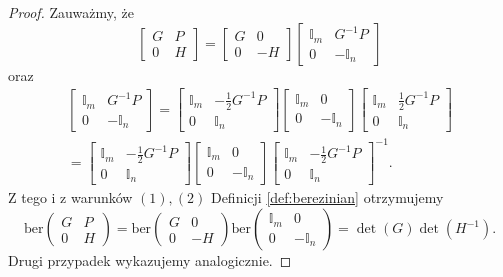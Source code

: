 \documentclass[11pt,a4paper]{report}
\theoremstyle{definition}
\newcommand{\ber}{\mathrm{ber}}
\begin{document}
\begin{proof}
 Zauważmy, że $$\begin{bmatrix}
      G & P \\
      0 & H
     \end{bmatrix} 
     = 
     \begin{bmatrix}
      G & 0 \\
      0 & -H
     \end{bmatrix} \begin{bmatrix}
      \mathbb{I}_m & G^{-1}P \\
      0 & - \mathbb{I}_n
     \end{bmatrix}$$ oraz
     \begin{equation*}
     \begin{aligned}
	  \begin{bmatrix}
	  \mathbb{I}_m & G^{-1}P \\
	  0 & - \mathbb{I}_n
	\end{bmatrix} 
	= 
	\begin{bmatrix}
	  \mathbb{I}_m & -\frac{1}{2}G^{-1}P \\
	  0 & \mathbb{I}_n
	\end{bmatrix} \begin{bmatrix}
	  \mathbb{I}_m & 0 \\
	  0 & - \mathbb{I}_n
	\end{bmatrix} \begin{bmatrix}
	  \mathbb{I}_m & \frac{1}{2}G^{-1}P \\
	  0 & \mathbb{I}_n
	\end{bmatrix} \\
	= 
	\begin{bmatrix}
	  \mathbb{I}_m & -\frac{1}{2}G^{-1}P \\
	  0 & \mathbb{I}_n
	\end{bmatrix} \begin{bmatrix}
	  \mathbb{I}_m & 0 \\
	  0 & - \mathbb{I}_n
	\end{bmatrix} \begin{bmatrix}
	  \mathbb{I}_m & -\frac{1}{2} G^{-1}P \\
	  0 & \mathbb{I}_n
	\end{bmatrix}^{-1}\!.
     \end{aligned}
     \end{equation*}
 Z tego i z warunków $(1),(2)$ Definicji \ref{def:berezinian} otrzymujemy $$\ber \left( \begin{matrix}
      G & P \\
      0 & H
     \end{matrix} \right) = \ber \left( \begin{matrix}
      G & 0 \\
      0 & -H
     \end{matrix} \right) \ber \left( \begin{matrix}
      \mathbb{I}_m & 0 \\
      0 & - \mathbb{I}_n
     \end{matrix} \right) = \det(G)\det(H^{-1}).$$
     Drugi przypadek wykazujemy analogicznie.
\end{proof}
\end{document}
